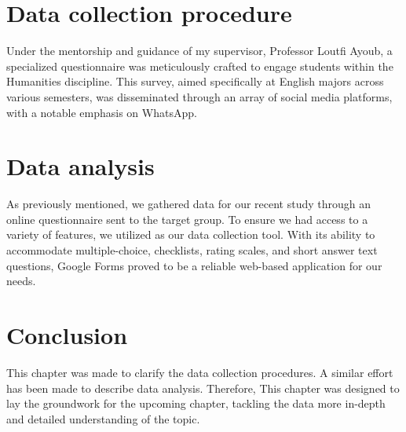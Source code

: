 \section{Data collection procedure}
Under the mentorship and guidance of my supervisor, Professor Loutfi Ayoub,
a specialized questionnaire was meticulously crafted to engage students within
the Humanities discipline. This survey, aimed specifically at English majors
across various semesters, was disseminated through an array
of social media platforms, with a notable emphasis on WhatsApp.
\section{Data analysis}

As previously mentioned, we gathered data for our recent study through an online questionnaire
sent to the target group. To ensure we had access to a variety of features, we utilized
 as our data collection tool. With its ability to accommodate multiple-choice,
checklists, rating scales, and short answer text questions, Google Forms proved to be a
reliable web-based application for our needs.
\section{Conclusion}
This chapter was made to clarify the data collection procedures. A similar effort has been made to
describe data analysis. Therefore, This chapter was designed to lay the groundwork for the upcoming
chapter, tackling the data more in-depth and detailed understanding of the topic.
